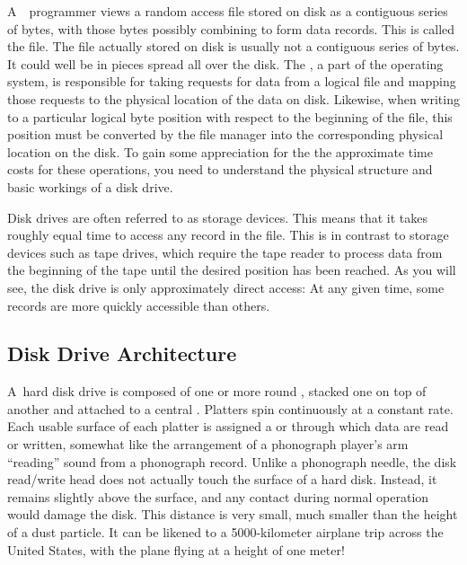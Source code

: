A~\Lang\ programmer views a random access file stored on disk
as a contiguous series of bytes, with those bytes possibly combining
to form data records.
This is called the  file.
The  file actually stored on disk is
usually not a contiguous series of
bytes.
It could well be in pieces spread all over the disk.
The , a part of the operating
system,
is responsible for taking requests for data from a logical
file and mapping those requests to the physical location of the data
on disk.
Likewise, when writing to a particular logical byte position
with respect to the beginning of the file, this position must be
converted by the file manager into the corresponding physical
location on the disk.
To gain some appreciation for the the approximate time costs for these
operations, you need to understand the physical structure and basic
workings of a disk drive.

Disk drives are often referred to as  storage
devices.
This means that it takes roughly equal time to access any record in
the file.
This is in contrast to 
storage devices such as tape drives, which require the tape reader to
process data from the beginning of the tape until the desired position
has been reached.
As you will see, the disk drive is only approximately direct access:
At any given time, some records are more quickly accessible than
others.

\subsection{Disk Drive Architecture}
\label{DiskArch}

A~hard disk drive is composed of one or more round ,
stacked one on top of another and attached to a central .
Platters spin continuously at a constant rate.
Each usable surface of each platter is assigned a
 or  through which data are
read or written, somewhat like the arrangement of a phonograph
player's arm ``reading'' sound from a phonograph record.
Unlike a phonograph needle, the disk read/write head does not actually
touch the surface of a hard disk.
Instead, it remains slightly above the surface, and any contact during
normal operation would damage the disk.
This distance is very small, much smaller than the height of a dust
particle.
It can be likened to a 5000-kilometer airplane trip across the United
States, with the plane flying at a height of one meter!

